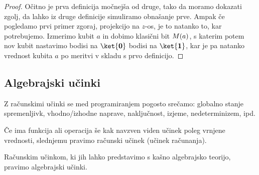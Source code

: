 \begin{proof}
    Očitno je prva definicija močnejša od druge, tako da moramo dokazati zgolj, da lahko iz druge definicije simuliramo obnašanje prve.
    Ampak če pogledamo prvi primer zgoraj, projekcijo na \(z\)-os, je to natanko to, kar potrebujemo. Izmerimo kubit \(a\) in dobimo klasični bit \(M{\left( {a} \right)}\), s katerim potem nov kubit nastavimo bodisi na \(\ket{\mb0}\) bodisi na \(\ket{\mb1}\), kar je pa natanko vrednost kubita \(a\) po meritvi v skladu s prvo definicijo.
\end{proof}

\subsection{Algebrajski učinki}

Z računskimi učinki se med programiranjem pogosto srečamo: globalno stanje spremenljivk, vhodno/izhodne naprave, naključnost, izjeme, nedeterminizem, ipd.

\begin{definition}
    Če ima funkcija ali operacija še kak navzven viden učinek poleg vrnjene vrednosti, slednjemu pravimo računski učinek (učinek računanja).
\end{definition}

\begin{definition}
    Računskim učinkom, ki jih lahko predstavimo s kašno algebrajsko teorijo, pravimo algebrajski učinki.
\end{definition}


